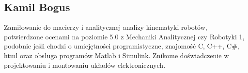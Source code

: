 \subsection{Kamil Bogus}
Zamiłowanie do macierzy i analitycznej analizy kinematyki robotów, potwierdzone ocenami na poziomie 5.0 z Mechaniki Analitycznej czy Robotyki 1, podobnie jeśli chodzi o umiejętności programistyczne, znajomość C, C++, C#, html oraz obsługa programów Matlab i Simulink. Znikome doświadczenie w projektowaniu i montowaniu układów elektronicznych.
